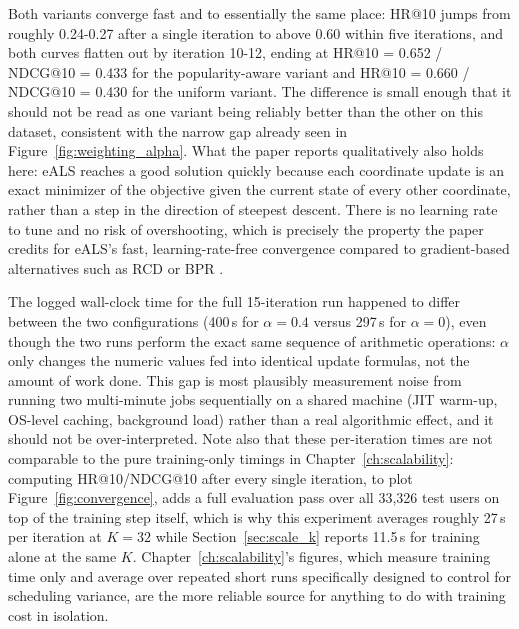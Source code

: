 Both variants converge fast and to essentially the same place: HR@10 jumps
from roughly 0.24-0.27 after a single iteration to above 0.60 within five
iterations, and both curves flatten out by iteration 10-12, ending at
HR@10 = 0.652 / NDCG@10 = 0.433 for the popularity-aware variant and
HR@10 = 0.660 / NDCG@10 = 0.430 for the uniform variant. The difference is
small enough that it should not be read as one variant being reliably
better than the other on this dataset, consistent with the narrow gap
already seen in Figure~\ref{fig:weighting_alpha}. What the paper reports
qualitatively also holds here: eALS reaches a good solution quickly because
each coordinate update is an exact minimizer of the objective given the
current state of every other coordinate, rather than a step in the
direction of steepest descent. There is no learning rate to tune and no
risk of overshooting, which is precisely the property the paper credits
for eALS's fast, learning-rate-free convergence compared to gradient-based
alternatives such as RCD \citep{devooght2015dynamic} or BPR
\citep{rendle2009bpr}.

\medskip
The logged wall-clock time for the full 15-iteration run happened to differ
between the two configurations (400\,s for $\alpha=0.4$ versus 297\,s for
$\alpha=0$), even though the two runs perform the exact same sequence of
arithmetic operations: $\alpha$ only changes the numeric values fed into
identical update formulas, not the amount of work done. This gap is most
plausibly measurement noise from running two multi-minute jobs sequentially
on a shared machine (JIT warm-up, OS-level caching, background load) rather
than a real algorithmic effect, and it should not be over-interpreted. Note
also that these per-iteration times are not comparable to the pure
training-only timings in Chapter~\ref{ch:scalability}: computing
HR@10/NDCG@10 after every single iteration, to plot Figure~\ref{fig:convergence},
adds a full evaluation pass over all 33{,}326 test users on top of the
training step itself, which is why this experiment averages roughly 27\,s
per iteration at $K=32$ while Section~\ref{sec:scale_k} reports 11.5\,s for
training alone at the same $K$. Chapter~\ref{ch:scalability}'s figures,
which measure training time only and average over repeated short runs
specifically designed to control for scheduling variance, are the more
reliable source for anything to do with training cost in isolation.
